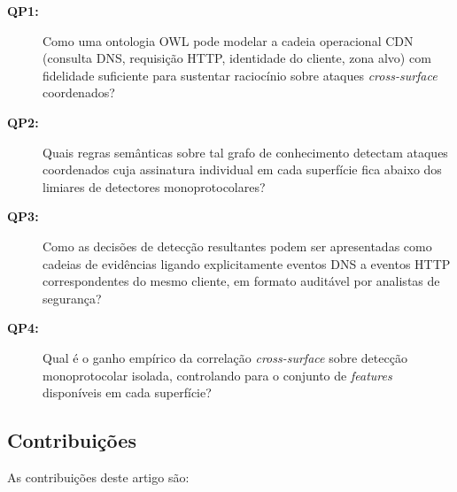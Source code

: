 \documentclass[preprint,12pt]{elsarticle}
\begin{document}
\begin{description}
    \item[\textbf{QP1:}] Como uma ontologia OWL pode modelar a cadeia operacional CDN (consulta DNS, requisição HTTP, identidade do cliente, zona alvo) com fidelidade suficiente para sustentar raciocínio sobre ataques \emph{cross-surface} coordenados?
    \item[\textbf{QP2:}] Quais regras semânticas sobre tal grafo de conhecimento detectam ataques coordenados cuja assinatura individual em cada superfície fica abaixo dos limiares de detectores monoprotocolares?
    \item[\textbf{QP3:}] Como as decisões de detecção resultantes podem ser apresentadas como cadeias de evidências ligando explicitamente eventos DNS a eventos HTTP correspondentes do mesmo cliente, em formato auditável por analistas de segurança?
    \item[\textbf{QP4:}] Qual é o ganho empírico da correlação \emph{cross-surface} sobre detecção monoprotocolar isolada, controlando para o conjunto de \emph{features} disponíveis em cada superfície?
\end{description}

\subsection{Contribuições}

As contribuições deste artigo são:
\end{document}
